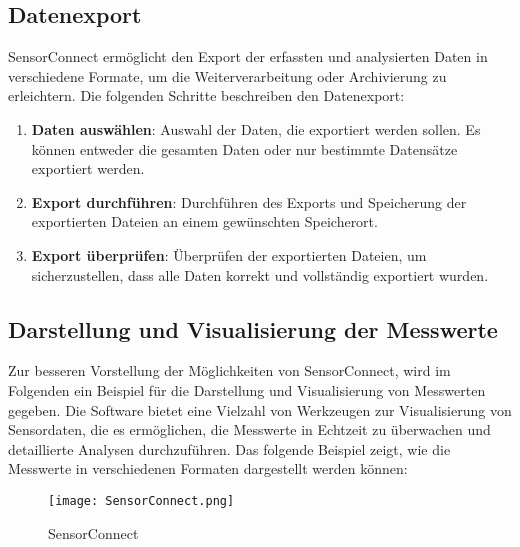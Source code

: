 \subsection{Datenexport}
SensorConnect ermöglicht den Export der erfassten und analysierten Daten in verschiedene Formate, um die Weiterverarbeitung oder Archivierung zu erleichtern. Die folgenden Schritte beschreiben den Datenexport:

\begin{enumerate}
    \item \textbf{Daten auswählen}: Auswahl der Daten, die exportiert werden sollen. Es können entweder die gesamten Daten oder nur bestimmte Datensätze exportiert werden.
    \item \textbf{Export durchführen}: Durchführen des Exports und Speicherung der exportierten Dateien an einem gewünschten Speicherort.
    \item \textbf{Export überprüfen}: Überprüfen der exportierten Dateien, um sicherzustellen, dass alle Daten korrekt und vollständig exportiert wurden.
\end{enumerate}

\subsection{Darstellung und Visualisierung der Messwerte}
Zur besseren Vorstellung der Möglichkeiten von SensorConnect, wird im Folgenden ein Beispiel für die Darstellung und Visualisierung von Messwerten gegeben. Die Software bietet eine Vielzahl von Werkzeugen zur Visualisierung von Sensordaten, die es ermöglichen, die Messwerte in Echtzeit zu überwachen und detaillierte Analysen durchzuführen. Das folgende Beispiel zeigt, wie die Messwerte in verschiedenen Formaten dargestellt werden können:

\begin{figure}[htbp]
    \begin{center}
        \texttt{[image: SensorConnect.png]}
        \caption[Benutzeroberfläche in SensorConnect]{SensorConnect
        }
        \label{fig:SensorConnect}
    \end{center}
\end{figure}

\clearpage

